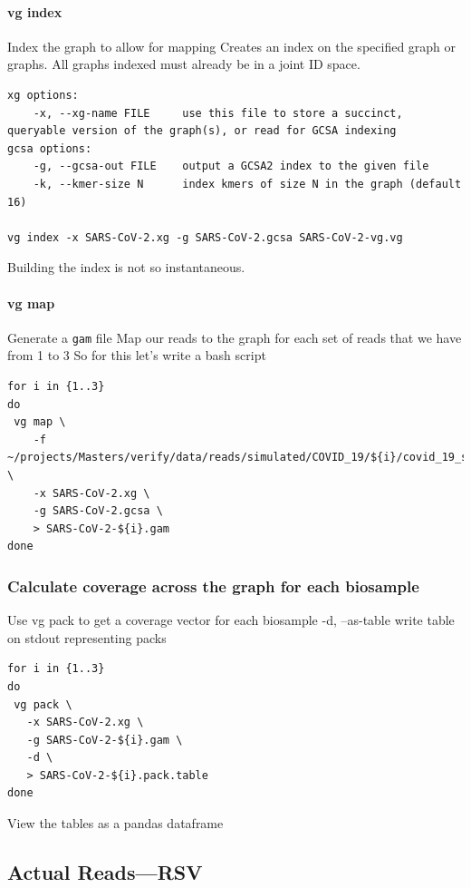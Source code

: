 \documentclass[10pt, a4paper]{article}
\begin{document}
\paragraph{vg index}
\label{sec:org75ee8bb}
Index the graph to allow for mapping
Creates an index on the specified graph or graphs. All graphs indexed must
already be in a joint ID space.

\begin{verbatim}
xg options:
    -x, --xg-name FILE     use this file to store a succinct, queryable version of the graph(s), or read for GCSA indexing
gcsa options:
    -g, --gcsa-out FILE    output a GCSA2 index to the given file
    -k, --kmer-size N      index kmers of size N in the graph (default 16)

vg index -x SARS-CoV-2.xg -g SARS-CoV-2.gcsa SARS-CoV-2-vg.vg
\end{verbatim}

Building the index is not so instantaneous.
\paragraph{vg map}
\label{sec:orge4c55cd}
Generate a \texttt{gam} file
Map our reads to the graph for each set of reads that we have from 1 to 3 So for this let’s write a bash script

\begin{verbatim}
for i in {1..3}
do 
 vg map \
    -f ~/projects/Masters/verify/data/reads/simulated/COVID_19/${i}/covid_19_sim_${i}_interleaved.fastq \
    -x SARS-CoV-2.xg \
    -g SARS-CoV-2.gcsa \
    > SARS-CoV-2-${i}.gam
done
\end{verbatim}

\subsubsection{Calculate coverage across the graph for each biosample}
\label{sec:org2da8fb3}
Use vg pack to get a coverage vector for each biosample
-d, --as-table         write table on stdout representing packs

\begin{verbatim}
for i in {1..3}
do 
 vg pack \
   -x SARS-CoV-2.xg \
   -g SARS-CoV-2-${i}.gam \
   -d \
   > SARS-CoV-2-${i}.pack.table
done
\end{verbatim}

View the tables as a pandas dataframe


\subsection{Actual Reads—RSV}
\label{sec:orgf2d4744}
\end{document}
